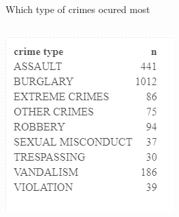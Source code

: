 \documentclass{beamer}\usepackage[]{graphicx}\usepackage[]{xcolor}
\makeatletter
\def\maxwidth{ %
  \ifdim\Gin@nat@width>\linewidth
    \linewidth
  \else
    \Gin@nat@width
  \fi
}
\newenvironment{knitrout}{}{} %
\makeatother
\begin{document}
\begin{frame}[fragile]{Which type of crimes ocured most}
\begin{columns}
\begin{knitrout}
\color{fgcolor}
\includegraphics[width=\maxwidth]{figure/crime_types.png} 
\end{knitrout}


\end{columns}
\end{frame}
\end{document}
